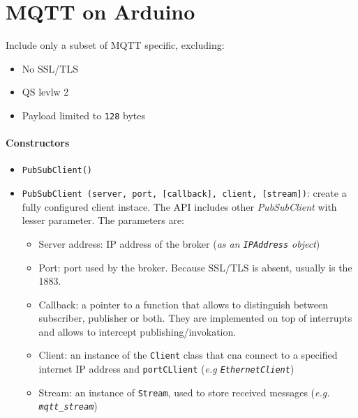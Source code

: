 \documentclass[10pt,a4paper]{report}
\theoremstyle{definition}
\begin{document}
\section{MQTT on Arduino}\label{sec:mqtt-on-arduino}
Include only a subset of MQTT specific, excluding:
\begin{itemize}
	\item 
	No SSL/TLS
	\item 
	QS levlw 2
	\item 
	Payload limited to \texttt{128} bytes
\end{itemize}
\paragraph{Constructors}\label{sec:constructors}\begin{itemize}
	\item 
	\texttt{PubSubClient()}
	\item 
	\texttt{PubSubClient (server, port, [callback], client, [stream])}: create a fully configured client instace. The API includes other \textit{PubSubClient} with lesser parameter. The parameters are:
	\begin{itemize}
		\item 
		Server address: IP address of the broker (\textit{as an \texttt{IPAddress} object})
		\item 
		Port: port used by the broker. Because SSL/TLS is absent, usually is the 1883.
		\item 
		Callback: a pointer to a function that allows to distinguish between subscriber, publisher or both. They are implemented on top of interrupts and allows to intercept publishing/invokation.
		\item 
		Client: an instance of the \texttt{Client} class that cna connect to a specified internet IP address and \texttt{portCLlient} (\textit{e.g \texttt{EthernetClient}})
		\item 
		Stream: an instance of \texttt{Stream}, used to store received messages (\textit{e.g. \texttt{mqtt\_stream}})
	\end{itemize}
\end{itemize}
\end{document}
